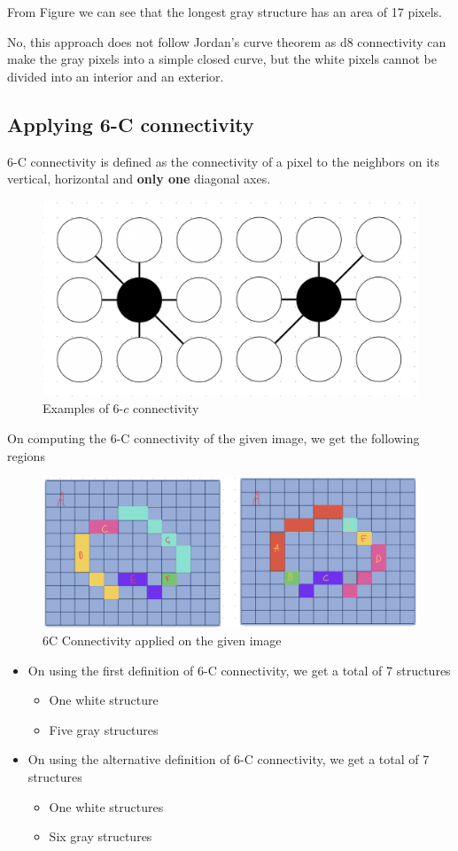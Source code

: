 \documentclass[a4paper,11pt]{article}
\begin{document}
From Figure %
we can see that the longest gray structure has an area of 17 pixels. \newline

No, this approach does not follow Jordan's curve theorem as d8 connectivity can make the gray pixels into a simple closed curve, but the white pixels cannot be divided into an interior and an exterior.



\subsection{Applying 6-C connectivity}

6-C connectivity is defined as the connectivity of a pixel to the neighbors on its vertical, horizontal and \textbf{only one} diagonal axes.
\newline
\begin{figure}[H]
    \centering
    \includegraphics[width=0.6\linewidth]{figs/6c_connectivity.png}
    \caption{Examples of 6-$c$ connectivity}
\end{figure}
On computing the 6-C connectivity of the given image, we get the following regions
\begin{figure}[h]
    \centering
    \includegraphics[width=0.8\linewidth]{figs/6C_connected_img.png}
    \caption{6C Connectivity applied on the given image}
\end{figure}
\begin{itemize}
    \item On using the first definition of 6-C connectivity, we get a total of 7 structures
    \begin{itemize}
        \item One white structure
        \item Five gray structures
    \end{itemize}
    \item On using the alternative definition of 6-C connectivity, we get a total of 7 structures
    \begin{itemize}
        \item One white structures 
        \item Six gray structures
    \end{itemize}
\end{itemize}
\end{document}
